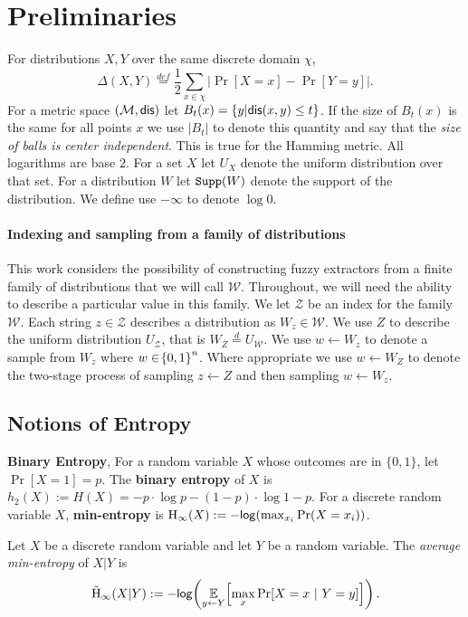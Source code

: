 
\section{Preliminaries}
\label{sec:prelim}
For distributions $X, Y$ over the same discrete domain $\chi$,
\[
\Delta(X, Y)\overset{def}= \frac{1}{2}\sum_{x \in \chi} \left| \Pr[X=x] - \Pr[Y=y]\right|.
\]
For a metric space $(\mathcal{M}, \mathsf{dis})$ let $B_t(x) = \{y | \mathsf{dis}(x, y)\le t\}$. If the size of $B_t(x)$ is the same for all points $x$ we use $|B_t|$ to denote this quantity and say that the \emph{size of balls is center independent}.  This is true for the Hamming metric.  All logarithms are base $2$. For a set $X$ let $U_X$ denote the uniform distribution over that set.  For a distribution $W$ let $\mathtt{Supp}(W)$ denote the support of the distribution.  We define use $-\infty$ to denote $\log{0}$.

\paragraph{Indexing and sampling from a family of distributions}
This work considers the possibility of constructing fuzzy extractors from a finite family of distributions that we will call $\mathcal{W}$. 
Throughout, we will need the ability to describe a particular value in this family.  
We let $\mathcal{Z}$ be an index for the family $\mathcal{W}$. Each string $z\in\mathcal{Z}$ describes a distribution as $W_z \in \mathcal{W}$. We use $Z$ to describe the uniform distribution $U_{\mathcal{Z}}$, that is $W_Z \overset{d}= U_{\mathcal{W}}$.  We use $w\leftarrow W_z$ to denote a sample from $W_z$ where  $w \in \!\left\{ 0,1 \right\}^{n}$.  Where appropriate we use $w\leftarrow W_Z$ to denote the two-stage process of sampling $z\leftarrow Z$ and then sampling $w\leftarrow W_z$.


\subsection{Notions of Entropy}
    \textbf{Binary Entropy}, %
    For a random variable $X$ whose outcomes are in $\{0,1\}$, let $\Pr[X=1] = p$. The \textbf{binary entropy} of $X$ is  $h_2(X) :=H(X)=-p\cdot\log{p} - (1-p)\cdot\log{1-p}.$ 
For a discrete random variable $X$, 
    \textbf{min-entropy} is $\mathrm{H}_{\infty}\!\left(X\right) := -\mathsf{log}\!\left(\max_{x_i} \Pr(X=x_i)\right)$.  
\begin{definition}
Let $X$ be a discrete random variable and let $Y$ be a random variable.  The \emph{average min-entropy} of $X|Y$ is  \[ \tilde{\mathrm{H}}_{\infty}\!\left(X|Y\right) := -\mathsf{log}\!\left(\operatorname*{\mathbb{E}}\limits_{y \leftarrow Y}\!\left[\max\limits_{x} \Pr\!\left[X = x\ |\ Y = y\right]\right]\right).\] 
\end{definition}

